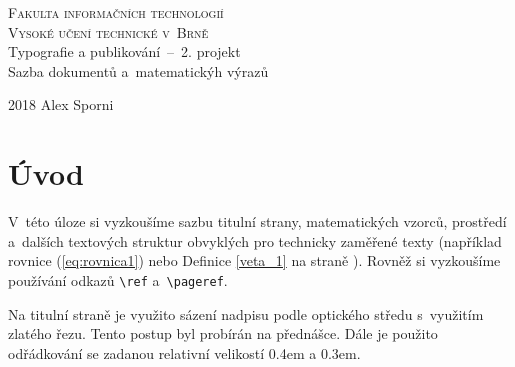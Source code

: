 \documentclass[a4paper, 11 pt, twocolumn]{article}
\theoremstyle{definition}
\begin{document}
\begin{titlepage}
    \begin{center}
      \Huge
      \textsc{Fakulta informačních technologií \\[0.3em]
      Vysoké učení technické v~Brně}
      \LARGE\\{Typografie a publikování \,--\, 2. projekt \\[0.4em]
             Sazba dokumentů a~matematickýh výrazů}
    \end{center}
    \Large{2018 \hfill Alex Sporni}
  \end{titlepage}
  
\section*{Úvod}
V~této úloze si vyzkoušíme sazbu titulní strany, matematic\-kých
vzorců, prostředí a~dalších textových struktur obvyklých
pro technicky zaměřené texty (například rovnice (\ref{eq:rovnica1})
nebo Definice \ref{veta_1} na straně \pageref{veta_1}). Rovněž si vyzkoušíme používání
odkazů \verb|\ref| a~\verb|\pageref|.

Na titulní straně je využito sázení nadpisu podle optického
středu s~využitím zlatého řezu. Tento postup byl
probírán na přednášce. Dále je použito odřádkování se
zadanou relativní velikostí 0.4em a 0.3em.
\end{document}
